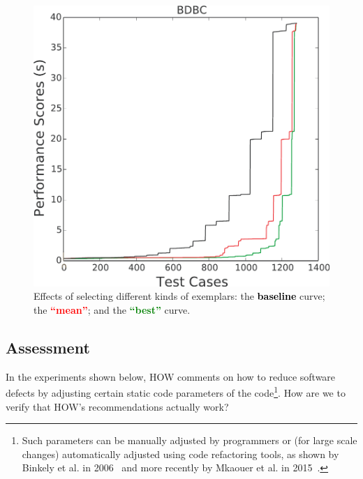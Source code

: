 \documentclass[conference]{IEEEtran}
\begin{document}
 \begin{figure}[!t]
\centering
%
\includegraphics[width=2.5inches]{figs/BDBC.pdf}
\caption{Effects of selecting different kinds of exemplars:
the   \textcolor{black}{\bf  baseline} curve; the
\textcolor{red}{\bf    ``mean''}; and the  
\textcolor{green}{\bf    ``best''} curve.}\label{fig:pp}
\end{figure}




\subsection{Assessment}\label{sect:assess}
In the experiments shown below,  HOW comments  on how to reduce
software defects by adjusting certain static code parameters of the code\footnote{Such parameters can be manually adjusted by programmers or (for large scale changes) automatically adjusted using code refactoring
tools, as shown by Binkely et al. in 2006~\cite{Binkley2006} and more recently by Mkaouer et al. in 2015~\cite{Mkaouer15}.}. How are we to verify that HOW's recommendations actually work? 
\end{document}
